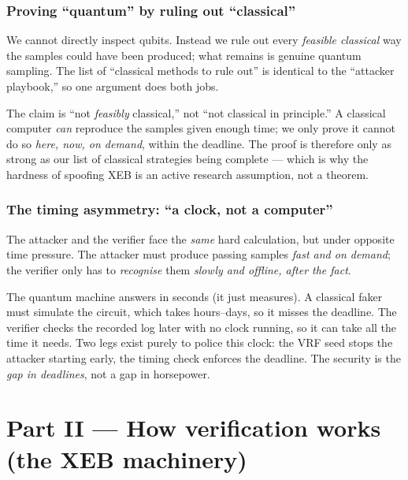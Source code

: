 \documentclass[11pt]{article}
\theoremstyle{definition}
\theoremstyle{plain}
\begin{document}
\section{Proving ``quantum'' by ruling out ``classical''}
We cannot directly inspect qubits. Instead we rule out every \emph{feasible classical}
way the samples could have been produced; what remains is genuine quantum sampling. The
list of ``classical methods to rule out'' is identical to the ``attacker playbook,'' so
one argument does both jobs.

\begin{warnbox}
The claim is ``not \emph{feasibly} classical,'' not ``not classical in principle.'' A
classical computer \emph{can} reproduce the samples given enough time; we only prove it
cannot do so \emph{here, now, on demand}, within the deadline. The proof is therefore only
as strong as our list of classical strategies being complete --- which is why the hardness
of spoofing XEB is an active research assumption, not a theorem.
\end{warnbox}

\section{The timing asymmetry: ``a clock, not a computer''}
The attacker and the verifier face the \emph{same} hard calculation, but under opposite
time pressure. The attacker must produce passing samples \emph{fast and on demand}; the
verifier only has to \emph{recognise} them \emph{slowly and offline, after the fact}.

\begin{plain}
The quantum machine answers in seconds (it just measures). A classical faker must simulate
the circuit, which takes hours--days, so it misses the deadline. The verifier checks the
recorded log later with no clock running, so it can take all the time it needs. Two legs
exist purely to police this clock: the VRF seed stops the attacker starting early, the
timing check enforces the deadline. The security is the \emph{gap in deadlines}, not a gap
in horsepower.
\end{plain}

\part*{Part II --- How verification works (the XEB machinery)}
\end{document}
